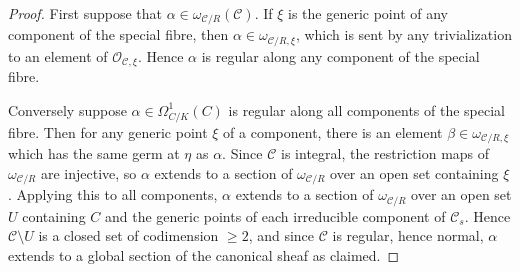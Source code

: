 \documentclass{article}
\theoremstyle{definition}
\theoremstyle{plain}
\theoremstyle{remark}
\begin{document}
	\begin{proof}
		First suppose that $\alpha \in \omega_{\mathcal{C}/R}(\mathcal{C})$. If $\xi$ is the generic point of any component of the special fibre, then $\alpha \in \omega_{\mathcal{C}/R, \xi}$, which is sent by any trivialization to an element of $\mathcal{O}_{\mathcal{C}, \xi}$. Hence $\alpha$ is regular along any component of the special fibre.
		
		Conversely suppose $\alpha\in \Omega^1_{C/K}(C)$ is regular along all components of the special fibre. Then for any generic point $\xi$ of a component, there is an element $\beta \in \omega_{\mathcal{C}/R, \xi}$ which has the same germ at $\eta$ as $\alpha$. Since $\mathcal{C}$ is integral, the restriction maps of $\omega_{\mathcal{C}/R}$ are injective, so $\alpha$ extends to a section of $\omega_{\mathcal{C}/R}$ over an open set containing $\xi$. Applying this to all components, $\alpha$ extends to a section of $\omega_{\mathcal{C}/R}$ over an open set $U$ containing $C$ and the generic points of each irreducible component of $\mathcal{C}_s$. Hence $\mathcal{C}\setminus U$ is a closed set of codimension $\ge 2$, and since $\mathcal{C}$ is regular, hence normal, $\alpha$ extends to a global section of the canonical sheaf as claimed.
	\end{proof}
\end{document}
